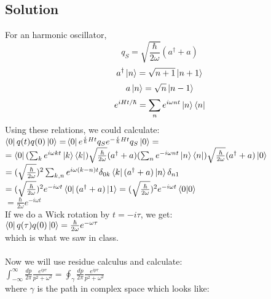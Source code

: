\documentclass{article}
\begin{document}
\subsection*{Solution}
For an harmonic oscillator,\\
\begin{equation*}
    q_S=\sqrt{\frac{\hbar}{2\omega}}(a^\dagger + a)
\end{equation*}
\begin{equation*}
    a^\dagger\ket{n}=\sqrt{n+1}\ket{n+1}
\end{equation*}
\begin{equation*}
    a\ket{n}=\sqrt{n}\ket{n-1}
\end{equation*}
\begin{equation*}
    e^{iHt/\hbar}=\sum_{n}e^{i\omega nt}\ket{n}\bra{n}
\end{equation*}
Using these relations, we could calculate:\\
$\bra{0}q(t)q(0)\ket{0}=$$\bra{0}e^{\frac{i}{\hbar} H t}q_Se^{-\frac{i}{\hbar}Ht}q_S\ket{0}=$\\
$=\bra{0}(\sum_{k}e^{i\omega kt}\ket{k}\bra{k})\sqrt{\frac{\hbar}{2\omega}}(a^\dagger + a)(\sum_{n}e^{-i\omega nt}\ket{n}\bra{n})\sqrt{\frac{\hbar}{2\omega}}(a^\dagger + a)\ket{0}$\\
$=(\sqrt{\frac{\hbar}{2\omega}})^2\sum_{k,n}e^{i\omega (k-n)t}\delta_{0 k}\bra{k}(a^\dagger + a)\ket{n}\delta_{n 1} $\\
$=(\sqrt{\frac{\hbar}{2\omega}})^2e^{-i\omega t}\bra{0}(a^\dagger + a)\ket{1}=(\sqrt{\frac{\hbar}{2\omega}})^2e^{-i\omega t}\braket{0}$\\
$=\boxed{\frac{\hbar}{2\omega}e^{-i\omega t}}$\\
If we do a Wick rotation by $t=-i\tau$, we get:\\
$\bra{0}q(\tau)q(0)\ket{0}=\frac{\hbar}{2\omega}e^{-\omega \tau}$\\
which is what we saw in class.\\\\
Now we will use residue calculus and calculate:\\
$\int_{-\infty}^{\infty}\frac{dp}{2\pi}\frac{e^{ip\tau}}{p^2+\omega^2}=\oint_\gamma\frac{dp}{2\pi}\frac{e^{ip\tau}}{p^2+\omega^2}$\\
where $\gamma$ is the path in complex space which looks like:\\
\end{document}
